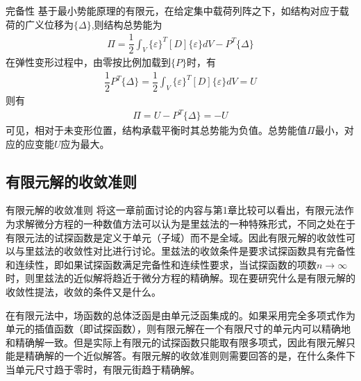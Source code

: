 \documentclass[11pt]{beamer}
\begin{document}
\begin{frame}{完备性}
基于最小势能原理的有限元，在给定集中载荷列阵之下，如结构对应于载荷的广义位移为$\{\Delta\}$,则结构总势能为
\begin{align*}
\Pi=\dfrac{1}{2}\int_V\{\varepsilon\}^{T}[D]\{\varepsilon\}dV-{P}^{T}\{\Delta\}
\end{align*}
在弹性变形过程中，由零按比例加载到$\{P\}$时，有
\begin{align*}
\dfrac{1}{2}{P}^{T}\{\Delta\}=\dfrac{1}{2}\int_V\{\varepsilon\}^{T}[D]\{\varepsilon\}dV=U
\end{align*}
则有
\begin{align*}
\Pi=U-{P}^{T}\{\Delta\}=-U
\end{align*}
可见，相对于未变形位置，结构承载平衡时其总势能为负值。总势能值$\Pi$最小，对应的应变能$U$应为最大。
\end{frame}

\subsection{有限元解的收敛准则}
\begin{frame}{有限元解的收敛准则}
将这一章前面讨论的内容与第1章比较可以看出，有限元法作为求解微分方程的一种数值方法可以认为是里兹法的一种特殊形式，不同之处在于有限元法的试探函数是定义于单元（子域）而不是全域。因此有限元解的收敛性可以与里兹法的收敛性对比进行讨论。里兹法的收敛条件是要求试探函数具有完备性和连续性，即如果试探函数满足完备性和连续性要求，当试探函数的项数$n\to\infty$时，则里兹法的近似解将趋近于微分方程的精确解。现在要研究什么是有限元解的收敛性提法，收敛的条件又是什么。
\par
在有限元法中，场函数的总体泛函是由单元泛函集成的。如果采用完全多项式作为单元的插值函数（即试探函数），则有限元解在一个有限尺寸的单元内可以精确地和精确解一致。但是实际上有限元的试探函数只能取有限多项式，因此有限元解只能是精确解的一个近似解答。有限元解的收敛准则则需要回答的是，在什么条件下当单元尺寸趋于零时，有限元街趋于精确解。
\end{frame}
\end{document}
